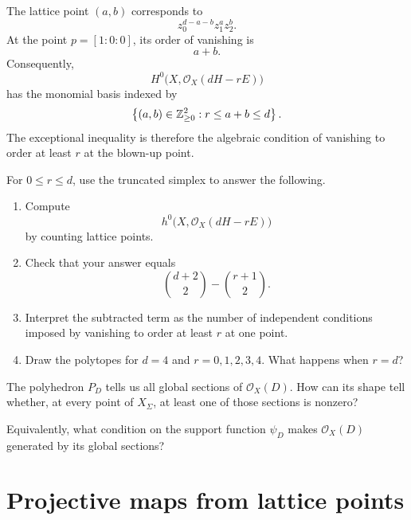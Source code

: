 The lattice point \((a,b)\) corresponds to
\[
z_0^{d-a-b}z_1^az_2^b.
\]
At the point \(p=[1:0:0]\), its order of vanishing is
\[
a+b.
\]
Consequently,
\[
H^0\bigl(X,\mathcal O_X(dH-rE)\bigr)
\]
has the monomial basis indexed by
\[
\left\{
(a,b)\in\mathbb{Z}_{\geq0}^2:
 r\leq a+b\leq d
\right\}.
\]
The exceptional inequality is therefore the algebraic condition of
vanishing to order at least \(r\) at the blown-up point.

\begin{surfacelaboratory}
For \(0\leq r\leq d\), use the truncated simplex to answer the
following.

\begin{enumerate}[label=(\alph*),wide=0pt]
\item Compute
\[
h^0\bigl(X,\mathcal O_X(dH-rE)\bigr)
\]
by counting lattice points.

\item Check that your answer equals
\[
\binom{d+2}{2}-\binom{r+1}{2}.
\]

\item Interpret the subtracted term as the number of independent
conditions imposed by vanishing to order at least \(r\) at one point.

\item Draw the polytopes for \(d=4\) and \(r=0,1,2,3,4\). What
happens when \(r=d\)?
\end{enumerate}
\end{surfacelaboratory}

\begin{guidingquestion}
The polyhedron \(P_D\) tells us all global sections of
\(\mathcal O_X(D)\). How can its shape tell whether, at every point of
\(X_\Sigma\), at least one of those sections is nonzero?

Equivalently, what condition on the support function \(\psi_D\) makes
\(\mathcal O_X(D)\) generated by its global sections?
\end{guidingquestion}

\section{Projective maps from lattice points}
\label{sec:projective-maps-lattice-points}

